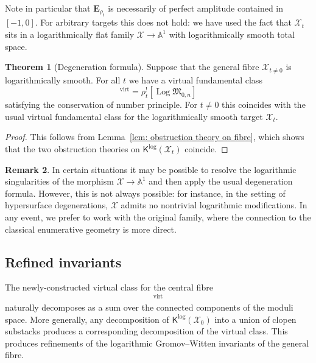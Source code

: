\documentclass[11pt]{amsart}
\theoremstyle{definition}
\theoremstyle{definition}
\newtheorem{theorem}{Theorem}[section]
\newtheorem{remark}[theorem]{Remark}
\newcommand{\EE}{\mathbf{E}}
\newcommand{\op}[1]{\operatorname{#1}}
\newcommand{\Aaff}{\mathbb{A}}
\newcommand{\virt}{\op{virt}}
\newcommand{\Xcal}{\mathcal{X}}
\newcommand{\Mfrak}{\mathfrak{M}}
\newcommand{\Kup}{\mathsf{K}}
\newcommand{\Log}{\operatorname{Log}}
\begin{document}
Note in particular that $\EE_{\rho_t}$ is necessarily of perfect amplitude contained in $[-1,0]$. For arbitrary targets this does not hold: we have used the fact that $\Xcal_t$ sits in a logarithmically flat family $\Xcal \to \Aaff^{\! 1}$ with logarithmically smooth total space.

\begin{theorem}[Degeneration formula] \label{thm: degeneration formula}
Suppose that the general fibre $\Xcal_{t \neq 0}$ is logarithmically smooth. For all $t$ we have a virtual fundamental class
\begin{equation*} [\Kup^{\log}(\Xcal_t)]^{\virt} = \rho_t^! [ \Log\Mfrak_{0,n}] \end{equation*}
satisfying the conservation of number principle. For $t \neq 0$ this coincides with the usual virtual fundamental class for the logarithmically smooth target $\Xcal_t$.\end{theorem}
\begin{proof}This follows from Lemma~\ref{lem: obstruction theory on fibre}, which shows that the two obstruction theories on $\Kup^{\log}(\Xcal_t)$ coincide.\end{proof}
 
\begin{remark} In certain situations it may be possible to resolve the logarithmic singularities of the morphism $\Xcal \to \Aaff^{\! 1}$ and then apply the usual degeneration formula. However, this is not always possible: for instance, in the setting of hypersurface degenerations, $\Xcal$ admits no nontrivial logarithmic modifications. In any event, we prefer to work with the original family, where the connection to the classical enumerative geometry is more direct. \end{remark}

\subsection{Refined invariants} The newly-constructed virtual class for the central fibre
\begin{equation*} [\Kup^{\log}(\Xcal_0)]^{\virt} \end{equation*}
naturally decomposes as a sum over the connected components of the moduli space. More generally, any decomposition of $\Kup^{\log}(\Xcal_0)$ into a union of clopen substacks produces a corresponding decomposition of the virtual class. This produces refinements of the logarithmic Gromov--Witten invariants of the general fibre.
\end{document}
